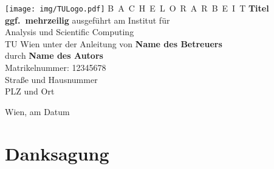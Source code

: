 \documentclass[a4paper,11pt,bibliography=totoc,listof=totoc,headinclude=true,cleardoublepage=empty,oneside]{scrbook}
\begin{document}


\begin{titlepage}
  \begin{center}
    \texttt{[image: img/TULogo.pdf]}
    \vskip 1cm%
    {\LARGE B~\Large A~C~H~E~L~O~R~A~R~B~E~I~T}
    \vskip 8mm
    {\huge\bfseries\color{change}Titel \\[1ex] ggf.\ mehrzeilig}
    \vskip 1cm
    \large 
    ausgef\"uhrt am    
    \vskip 0.75cm
    {\Large Institut f\"ur\\[1ex] Analysis und Scientific Computing}\\[1ex]
    {\Large TU Wien}
    \vskip0.75cm
    unter der Anleitung von
    \vskip0.75cm
    {\Large\bfseries\color{change}Name des Betreuers}\\[1ex]
    \vskip 0.5cm
    durch
    \vskip 0.5cm
    {\Large\bfseries\color{change}Name des Autors}\\[1ex]
    Matrikelnummer: {\color{change}12345678}\\[1ex]
    {\color{change}Straße und Hausnummer}\\[1ex]
    {\color{change}PLZ und Ort}
  \end{center}
  
  \vfill
  
  \small
  Wien, am {\color{change} Datum} %
  \vspace*{-15mm}
\end{titlepage}

\cleardoublepage


\chapter*{Danksagung} %
\thispagestyle{empty}
\end{document}
